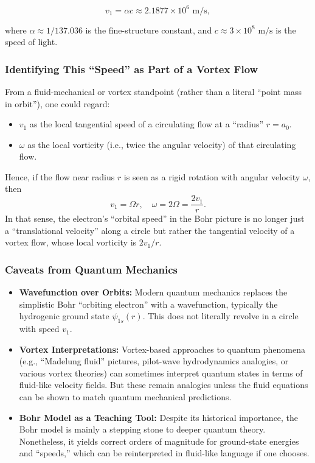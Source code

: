 \begin{equation}
    v_1 = \alpha c \approx 2.1877 \times 10^6 \text{ m/s},\label{eq:tangetial-velocity}
\end{equation}

where $\alpha \approx 1/137.036$ is the fine-structure constant, and $c \approx 3 \times 10^8 \text{ m/s}$ is the speed of light.

\subsubsection*{Identifying This ``Speed'' as Part of a Vortex Flow}
From a fluid-mechanical or vortex standpoint (rather than a literal ``point mass in orbit''), one could regard:

\begin{itemize}
    \item $v_1$ as the local tangential speed of a circulating flow at a ``radius'' $r = a_0$.
    \item $\omega$ as the local vorticity (i.e., twice the angular velocity) of that circulating flow.
\end{itemize}

Hence, if the flow near radius $r$ is seen as a rigid rotation with angular velocity $\omega$, then
\begin{equation}
    v_1 = \Omega r, \quad \omega = 2\Omega = \frac{2v_1}{r}.\label{eq:angular-velocity}
\end{equation}
In that sense, the electron’s ``orbital speed'' in the Bohr picture is no longer just a ``translational velocity'' along a circle but rather the tangential velocity of a vortex flow, whose local vorticity is $2 v_1 / r$.

\subsubsection*{Caveats from Quantum Mechanics}
\begin{itemize}
    \item \textbf{Wavefunction over Orbits:} Modern quantum mechanics replaces the simplistic Bohr ``orbiting electron'' with a wavefunction, typically the hydrogenic ground state $\psi_{1s}(r)$.
    This does not literally revolve in a circle with speed $v_1$.
    \item \textbf{Vortex Interpretations:} Vortex-based approaches to quantum phenomena (e.g., ``Madelung fluid'' pictures, pilot-wave hydrodynamics analogies, or various vortex theories) can sometimes interpret quantum states in terms of fluid-like velocity fields.
    But these remain analogies unless the fluid equations can be shown to match quantum mechanical predictions.
    \item \textbf{Bohr Model as a Teaching Tool:} Despite its historical importance, the Bohr model is mainly a stepping stone to deeper quantum theory.
    Nonetheless, it yields correct orders of magnitude for ground-state energies and ``speeds,'' which can be reinterpreted in fluid-like language if one chooses.
\end{itemize}

